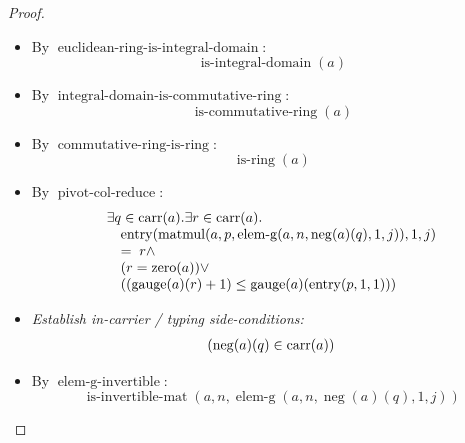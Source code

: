 \documentclass[11pt]{article}
\theoremstyle{plain}
\begin{document}
\begin{proof}
\begin{itemize}[leftmargin=2.8em, itemsep=4pt, parsep=1pt]
  \item[\textbf{11}] By $\operatorname{euclidean\text{-}ring\text{-}is\text{-}integral\text{-}domain}$:
\begin{equation*}
\operatorname{is\text{-}integral\text{-}domain}(a)
\end{equation*}

  \item[\textbf{12}] By $\operatorname{integral\text{-}domain\text{-}is\text{-}commutative\text{-}ring}$:
\begin{equation*}
\operatorname{is\text{-}commutative\text{-}ring}(a)
\end{equation*}

  \item[\textbf{13}] By $\operatorname{commutative\text{-}ring\text{-}is\text{-}ring}$:
\begin{equation*}
\operatorname{is\text{-}ring}(a)
\end{equation*}

  \item[\textbf{14}] By $\operatorname{pivot\text{-}col\text{-}reduce}$:
\begin{equation*}
\begin{array}{@{}l@{}} \exists q \in \operatorname{carr}(a). \exists r \in \operatorname{carr}(a). \\ \quad \operatorname{entry}(\operatorname{matmul}(a, p, \operatorname{elem\text{-}g}(a, n, \operatorname{neg}(a)(q), 1, j)), 1, j) \\ \quad =\; r \wedge \\ \quad (r = \operatorname{zero}(a)) \vee \\ \quad ((\operatorname{gauge}(a)(r) + 1) \leq \operatorname{gauge}(a)(\operatorname{entry}(p, 1, 1))) \end{array}
\end{equation*}

  \item[\textbf{15--20}] \emph{Establish in-carrier / typing side-conditions:}
\begin{equation*}
\begin{array}{@{}l@{}}
(\operatorname{neg}(a)(q) \in \operatorname{carr}(a))
\end{array}
\end{equation*}

  \item[\textbf{21}] By $\operatorname{elem\text{-}g\text{-}invertible}$:
\begin{equation*}
\operatorname{is\text{-}invertible\text{-}mat}(a, n, \operatorname{elem\text{-}g}(a, n, \operatorname{neg}(a)(q), 1, j))
\end{equation*}


\end{itemize}
\end{proof}
\end{document}
